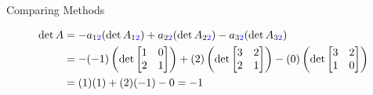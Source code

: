 \documentclass[xcolor=dvipsnames,aspectratio=169,t]{beamer}
\begin{document}
\begin{frame}{Comparing Methods}
\vspace{-0.2in}

{\small
\begin{align*}
  \det A &= -a_{1\textcolor{blue}{2}} (\det A_{1\textcolor{blue}{2}} ) + a_{2\textcolor{blue}{2}}( \det A_{2\textcolor{blue}{2}}) - a_{3\textcolor{blue}{2}}( \det A_{3\textcolor{blue}{2}})\\
  &= -(-1) \left( \det \begin{bmatrix} 1 & 0 \\ 2 & 1\end{bmatrix} \right) 
     + (2) \left( \det \begin{bmatrix} 3 & 2 \\ 2 & 1\end{bmatrix} \right) 
     - (0) \left( \det \begin{bmatrix} 3 & 2 \\ 1 & 0\end{bmatrix} \right)  \\
  &= (1)(1) + (2)(-1)-0 = -1
\end{align*}}

\end{frame}
\end{document}
